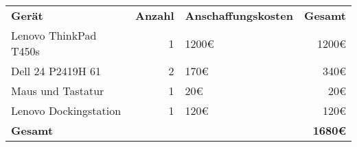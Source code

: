 \begin{tabu}{lrlr}
\rowfont{\bfseries\leavevmode\color{headingfont}}\textbf{Gerät} & \textbf{Anzahl} & \textbf{Anschaffungskosten} & \textbf{Gesamt} \\
Lenovo ThinkPad T450s & 1 & 1200€ & 1200€\\
Dell 24 P2419H 61 & 2 & 170€ & 340€ \\
Maus und Tastatur & 1 & 20€ & 20€ \\
Lenovo Dockingstation & 1 & 120€ & 120€ \\
\hline
\hline
{}\textbf{Gesamt} & & & \textbf{1680€} \\
\end{tabu}